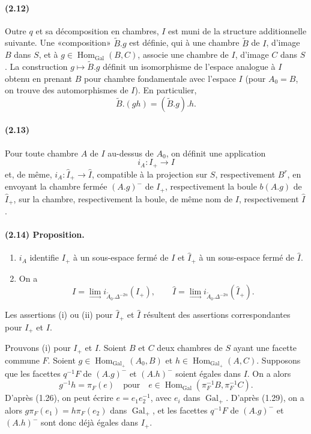 \documentclass[10pt,a4paper]{article}
\providecommand{\varinjlim}{\mathop{\mathrm{lim}}\limits_{\longrightarrow}}
\begin{document}
\paragraph{(2.12)} Outre \(q\) et sa décomposition en chambres, \(I\) est muni de la structure additionnelle suivante. Une «composition» \(\widetilde B.g\) est définie, qui à une chambre \(\widetilde B\) de \(I\), d'image \(B\) dans \(S\), et à \(g\in\operatorname{Hom}_{\operatorname{Gal}}(B,C)\), associe une chambre de \(I\), d'image \(C\) dans \(S\). La construction \(g\mapsto\widetilde B.g\) définit un isomorphisme de l'espace analogue à \(I\) obtenu en prenant \(B\) pour chambre fondamentale avec l'espace \(I\) (pour \(A_0=B\), on trouve des automorphismes de \(I\)). En particulier,
\[
\widetilde B.(gh)=(\widetilde B.g).h.
\]

\paragraph{(2.13)} Pour toute chambre \(A\) de \(I\) au-dessus de \(A_0\), on définit une application
\[
i_A:I_+\longrightarrow I
\]
et, de même, \(i_A:\widehat I_+\to\widehat I\), compatible à la projection sur \(S\), respectivement \(B^r\), en envoyant la chambre fermée \((A.g)^{-}\) de \(I_+\), respectivement la boule \(b(A.g)\) de \(\widehat I_+\), sur la chambre, respectivement la boule, de même nom de \(I\), respectivement \(\widehat I\).

\paragraph{(2.14) Proposition.}
\begin{enumerate}[label=(\roman*)]
\item \(i_A\) identifie \(I_+\) à un sous-espace fermé de \(I\) et \(\widehat I_+\) à un sous-espace fermé de \(\widehat I\).
\item On a
\[
I=\varinjlim i_{\widetilde A_0.\Delta^{-2n}}(I_+),
\qquad
\widehat I=\varinjlim i_{\widetilde A_0.\Delta^{-2n}}(\widehat I_+).
\]
\end{enumerate}
Les assertions (i) ou (ii) pour \(\widehat I_+\) et \(\widehat I\) résultent des assertions correspondantes pour \(I_+\) et \(I\).

Prouvons (i) pour \(I_+\) et \(I\). Soient \(B\) et \(C\) deux chambres de \(S\) ayant une facette commune \(F\). Soient \(g\in\operatorname{Hom}_{\operatorname{Gal}_+}(A_0,B)\) et \(h\in\operatorname{Hom}_{\operatorname{Gal}_+}(A,C)\). Supposons que les facettes \(q^{-1}F\) de \((A.g)^{-}\) et \((A.h)^{-}\) soient égales dans \(I\). On a alors
\[
g^{-1}h=\pi_F(e)
\quad\text{pour}\quad
e\in\operatorname{Hom}_{\operatorname{Gal}}(\pi_F^{-1}B,\pi_F^{-1}C).
\]
D'après (1.26), on peut écrire \(e=e_1e_2^{-1}\), avec \(e_i\) dans \(\operatorname{Gal}_+\). D'après (1.29), on a alors \(g\pi_F(e_1)=h\pi_F(e_2)\) dans \(\operatorname{Gal}_+\), et les facettes \(q^{-1}F\) de \((A.g)^{-}\) et \((A.h)^{-}\) sont donc déjà égales dans \(I_+\).
\end{document}
